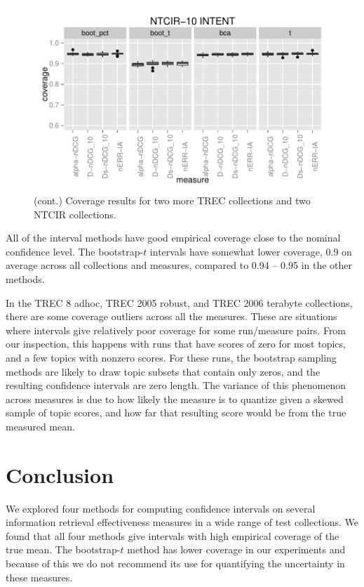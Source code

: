 \documentclass{sig-alt-release-2013}
\begin{document}
\begin{figure}
\includegraphics[width=\linewidth]{ntcir10-intent}
\caption{\label{results-2}(cont.) Coverage results for two more TREC collections and two NTCIR collections.}
\end{figure}

All of the interval methods have good empirical coverage close to the nominal confidence level.  The bootstrap-$t$ intervals have somewhat lower coverage, 0.9 on average across all collections and measures, compared to 0.94 -- 0.95 in the other methods.

In the TREC 8 adhoc, TREC 2005 robust, and TREC 2006 terabyte collections, there are some coverage outliers across all the measures.  These are situations where intervals give relatively poor coverage for some run/measure pairs.  From our inspection, this happens with runs that have scores of zero for most topics, and a few topics with nonzero scores.  For these runs, the bootstrap sampling methods are likely to draw topic subsets that contain only zeros, and the resulting confidence intervals are zero length.  The variance of this phenomenon across measures is due to how likely the measure is to quantize given a skewed sample of topic scores, and how far that resulting score would be from the true measured mean.

\section{Conclusion}

We explored four methods for computing confidence intervals on several information retrieval effectiveness measures in a wide range of test collections.  We found that all four methods give intervals with high empirical coverage of the true mean.  The bootstrap-$t$ method has lower coverage in our experiments and because of this we do not recommend its use for quantifying the uncertainty in these measures.
\end{document}
